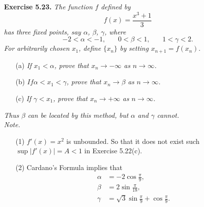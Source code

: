 \documentclass{article}
\begin{document}



\textbf{Exercise 5.23.}
\emph{The function $f$ defined by
\[
  f(x) = \frac{x^3 + 1}{3}
\]
has three fixed points, say $\alpha$, $\beta$, $\gamma$, where
\[
  -2 < \alpha < -1, \:\:\:\:\:\:\:\:
  0 < \beta < 1, \:\:\:\:\:\:\:\:
  1 < \gamma < 2.
\]
For arbitrarily chosen $x_1$, define $\{x_n\}$ by setting $x_{n+1} = f(x_n)$.}
\begin{enumerate}
  \item[(a)]
  \emph{If $x_1 < \alpha$, prove that $x_n \to -\infty$ as $n \to \infty$.}

  \item[(b)]
  \emph{$If \alpha < x_1 < \gamma$, prove that $x_n \to \beta$ as $n \to \infty$.}

  \item[(c)]
  \emph{If $\gamma < x_1$, prove that $x_n \to +\infty$ as $n \to \infty$.}
  \end{enumerate}
\emph{Thus $\beta$ can be located by this method,
but $\alpha$ and $\gamma$ cannot.} \\

\emph{Note.}
\begin{enumerate}
\item[(1)]
$f'(x) = x^2$ is unbounded.
So that it does not exist such $\sup|f'(x)| = A < 1$ in Exercise 5.22(c).

\item[(2)]
Cardano's Formula implies that
\begin{align*}
  \alpha &= -2 \cos\frac{\pi}{9}, \\
  \beta &= 2 \sin\frac{\pi}{18}, \\
  \gamma &= \sqrt{3} \sin\frac{\pi}{9} + \cos\frac{\pi}{9}.
\end{align*}

\end{enumerate}
\end{document}
